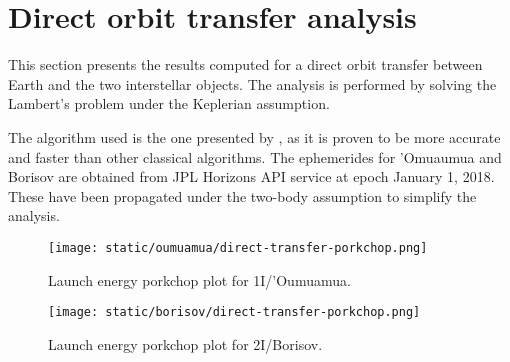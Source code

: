 \section{Direct orbit transfer analysis}

This section presents the results computed for a direct orbit transfer between
Earth and the two interstellar objects. The analysis is performed by solving the
Lambert's problem under the Keplerian assumption.

The algorithm used is the one presented by \cite{izzo2015}, as it is proven to
be more accurate and faster than other classical algorithms. The ephemerides for
'Omuaumua and Borisov are obtained from JPL Horizons API service at epoch
January 1, 2018. These have been propagated under the two-body assumption to
simplify the analysis.


\newpage
\begin{figure}[H]
  \centering
  \texttt{[image: static/oumuamua/direct-transfer-porkchop.png]}
  \caption{Launch energy porkchop plot for 1I/'Oumuamua.}
  \label{fig:oumuamua-direct-transfer-porkchop}
\end{figure}
\begin{figure}[H]
  \centering
  \texttt{[image: static/borisov/direct-transfer-porkchop.png]}
  \caption{Launch energy porkchop plot for 2I/Borisov.}
  \label{fig:oumuamua-direct-transfer-porkchop}
  \label{fig:borisov-direct-transfer-porkchop}
\end{figure}
